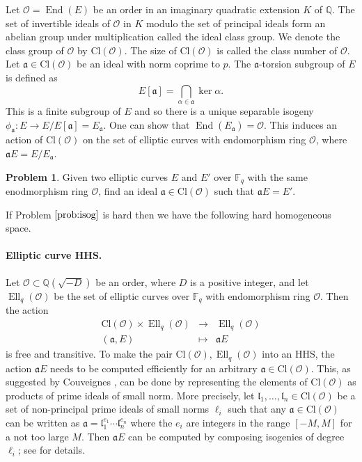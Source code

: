 \documentclass[11pt]{article}
\theoremstyle{plain}
\theoremstyle{definition}
\newtheorem{problem}[theorem]{Problem}
\DeclareMathOperator{\groupofend}{End} %
\DeclareMathOperator{\elli}{Ell}
\def\Q{\mathbb{Q}}
\def\F{\mathbb{F}}
\renewcommand{\O}{\mathcal{O}}
\newcommand{\clo}{\text{Cl}(\mathcal{O})}
\begin{document}
Let $\O = \groupofend(E)$ be an order in an imaginary quadratic extension $K$ of $\Q$. The set of 
invertible ideals of $\O$ in $K$ modulo the set of principal ideals form an abelian group under 
multiplication called the ideal class group. We denote the class group of $\O$ by $\clo$. The size 
of $\clo$ is called the class number of $\O$. Let $\mathfrak{a} \in \clo$ be an ideal with norm 
coprime to $p$. The $\mathfrak{a}$-torsion subgroup of $E$ is defined as
\[ E[\mathfrak{a}] = \bigcap_{\alpha \in \mathfrak{a}} \ker \alpha. \]
This is a finite subgroup of $E$ and so there is a unique separable isogeny $\phi_{\mathfrak{a}}: E 
\rightarrow E / E[\mathfrak{a}] = E_{\mathfrak{a}}$. One can show that $\groupofend(E_{\mathfrak{a}}) 
= \O$. This induces an action of $\clo$ on the set of elliptic curves with endomorphism ring $\O$, 
where $\mathfrak{a} E = E / E_{\mathfrak{a}}$.

\begin{problem}
\label{prob:isog}
	Given two elliptic curves $E$ and $E'$ over $\F_q$ with the same enodmorphism ring $\O$, find an 
	ideal $\mathfrak{a} \in \clo$ such that $\mathfrak{a} E = E'$.
\end{problem}

If Problem $\ref{prob:isog}$ is hard then we have the following hard homogeneous space.

\paragraph{Elliptic curve HHS.}
Let $\O \subset \Q(\sqrt{-D})$ be an order, where $D$ is a positive integer, and let $\elli_q(\O)$ 
be the set of elliptic curves over $\F_q$ with endomorphism ring $\O$. Then the action
\[
\begin{array}{rll}
	\clo \times \elli_q(\O) & \longrightarrow & \elli_q(\O) \\
	(\mathfrak{a}, E) & \longmapsto & \mathfrak{a} E
\end{array}
\]
is free and transitive. To make the pair $\clo, \elli_q(\O)$ into an HHS, the action $\mathfrak{a} 
E$ needs to be computed efficiently for an arbitrary $\mathfrak{a} \in \clo$. This, as suggested by 
Couveignes \cite{couveignes2006hard}, can be done by representing the elements of $\clo$ as products 
of prime ideals of small norm. More precisely, let $\mathfrak{l}_1, \dots, \mathfrak{l}_n \in \clo$ 
be a set of non-principal prime ideals of small norms $\ell_i$ such that any $\mathfrak{a} \in \clo$ 
can be written as $\mathfrak{a} = \mathfrak{l}_1^{e_1} \cdots \mathfrak{l}_n^{e_n}$ where the $e_i$ 
are integers in the range $[-M, M]$ for a not too large $M$. Then $\mathfrak{a} E$ can be computed 
by composing isogenies of degree $\ell_i$; see \cite{de2018towards} for details.
\end{document}
